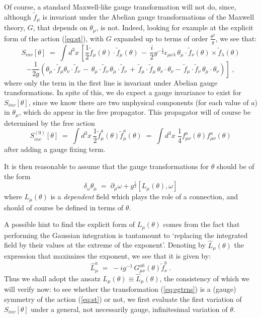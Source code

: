 \documentclass[a4paper,12pt]{article}
\begin{document}
Of course, a standard Maxwell-like gauge transformation will not do,
since, although ${\tilde f}_\mu$ is invariant under the Abelian gauge
transformations of the Maxwell theory, $G$, that depends on
$\theta_\mu$, is not. Indeed, looking for example at the explicit form
of the action (\ref{eq:st}), with $G$ expanded up to terms of order
$\frac{\theta^2}{g}$, we see that:
$$
S_{inv}[\theta] \;=\; \int d^3x \, \left[ \frac{1}{2} {\tilde
    f}_\mu(\theta) \cdot {\tilde f}_\mu(\theta) \,-\,\frac{i}{2}
  g^{-\frac{1}{2}} \epsilon_{\mu\nu\lambda} \, \theta_\mu \cdot
  {\tilde f}_\nu (\theta) \times {\tilde f}_\lambda(\theta) \right.
$$
\begin{equation}
\left. - \frac{1}{2 g} ( \theta_\mu\cdot{\tilde f}_\mu  
\theta_\nu\cdot{\tilde f}_\nu  \,-\,
\theta_\mu\cdot{\tilde f}_\nu \,  \theta_\mu\cdot{\tilde f}_\nu \,
+\, {\tilde f}_\mu\cdot{\tilde f}_\mu \,  \theta_\nu\cdot \theta_\nu
  -\, {\tilde f}_\mu\cdot{\tilde f}_\nu  \,  \theta_\mu \cdot
  \theta_\nu )
\right] \;,
\end{equation}
where only the term in the first line is invariant under Abelian gauge
transformations.  In spite of this, we do expect a gauge invariance to
exist for $S_{inv}[\theta]$, since we know there are two unphysical
components (for each value of $a$) in $\theta_\mu$, which do appear in
the free propagator. This propagator will of course be determined by
the free action
\begin{equation}\label{eq:mxwll}
S^{(0)}_{inv} [\theta]\;=\; \int d^3x\, \frac{1}{2} {\tilde f}_\mu^a(\theta)
{\tilde f}_\mu^a(\theta) \;=\; \int d^3x \;\frac{1}{4} f^a_{\mu\nu}(\theta) f^a_{\mu\nu}(\theta)
\end{equation}
after adding a gauge fixing term.

It is then reasonable to assume that the gauge transformations for
$\theta$ should be of the form
\begin{equation}\label{eq:egtrns}
\delta_\omega \theta_\mu \;=\; \partial_\mu \omega + g^{\frac{1}{2}} [L_\mu(\theta) , \omega]
\end{equation}
where $L_\mu(\theta)$ is a {\em dependent\/} field which plays the
role of a connection, and should of course be defined in terms of
$\theta$.

A possible hint to find the explicit form of $L_\mu(\theta)$ comes
from the fact that performing the Gaussian integration is tantamount
to `replacing the integrated field by their values at the extreme of
the exponent'.  Denoting by ${\hat L}_\mu(\theta)$ the expression that
maximizes the exponent, we see that it is given by:
\begin{equation}\label{eq:ltheta}
{\hat L}^a_\mu \;=\; - i g^{-1} \, G_{\mu\nu}^{ab}(\theta) {\tilde f}_\nu^b\;.
\end{equation}
Thus we shall adopt the ansatz $L_\mu(\theta) \equiv {\hat L}_\mu
(\theta)$, the consistency of which we will verify now: to see whether
the transformation (\ref{eq:egtrns}) is a (gauge) symmetry of the
action (\ref{eq:st}) or not, we first evaluate the first variation of
$S_{inv}[\theta]$ under a general, not necessarily gauge,
infinitesimal variation of $\theta$.
\end{document}
